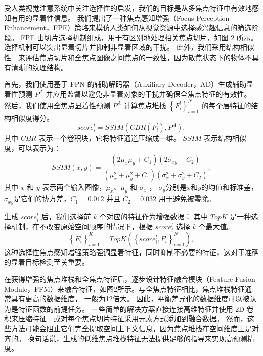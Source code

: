 

受人类视觉注意系统中关注选择性的启发，我们的目标是从多焦点特征中有效地感知有用的显着性信息。 我们提出了一种焦点感知增强（Focus Perception Enhancement，FPE）策略来模仿人类如何从视觉资源中选择感兴趣信息的筛选阶段。 FPE 由切片选择机制组成，用于有区别地处理相关焦点切片，如图 2 所示。选择机制可以突出显着切片并抑制非显着区域的干扰。 此外，我们采用结构相似性~\cite{wang2003multiscale}~来评估焦点切片和全焦点图像之间焦点的一致性，因为散焦状态下的物体不具有清晰的纹理结构。 
%
%
%
%
\par
%
%
首先，我们使用基于 FPN 的辅助解码器（Auxiliary Decoder，AD）生成辅助显着性预测 $ P^{A} $ 并应用监督以避免非显着对象的干扰并确保全焦点特征的有效性。 然后，我们使用全焦点显着性预测 $ P^{A} $ 计算焦点堆栈 $ \left \{ F_{i}^{l} \right \}_{i=1}^{N} $ 的每个层特征的结构相似度得分。 
\begin{equation}
	score_{i}^{l} = SSIM \left ( CBR \left ( F_{i}^{l} \right ), P^{A} \right ),
\end{equation}
%
%
其中 $CBR$ 表示一个卷积块，它将特征通道压缩成一维。 $SSIM$ 表示结构相似度，可以表示为： 
%
%
\begin{equation} 	
	SSIM(x,y)=\frac{\left ( 2\mu_{x}\mu_{y}+C_{1} \right ) \left (  2\sigma_{xy}+C_{2} \right )  } 	
	{\left ( \mu_{x}^{2} + \mu_{y}^{2}+C_{1}\right ) \left ( \sigma_{x}^{2}+ \sigma_{y}^{2} + C_{2} \right ) } , 	
\end{equation}
其中 $x$ 和 $y$ 表示两个输入图像，$\mu_{x}$、$\mu_{y}$ 和 $\sigma_{x}$ ， $\sigma_{y}$分别是$x$和$y$的均值和标准差，$\sigma_{xy}$是它们的协方差，$C_{1} = 0.012$ 并且 $C_{2} = 0.032$ 用于避免被零除。 
%
%
%
%
\par
%
%
生成 $ score_{i}^{l} $ 后，我们选择前 $k$ 个对应的特征作为增强数据：
其中 $ TopK $ 是一种选择机制，在不改变原始空间顺序的情况下，根据 $ score_{i}^{l} $ 选择 $k$ 个最大值。 
\begin{equation}
	\left \{ E_{i}^{l} \right \}_{i=1}^{K} = TopK \left ( \left \{ score_{i}^{l}, F_{i}^{l} \right \}_{i=1}^{N} \right ), 	
\end{equation}
%
%
这种选择性焦点感知增强策略强调显着特征，同时抑制不必要的特征，这对于准确的显着目标检测至关重要。
%
%
%
%
\par
%
%
在获得增强的焦点堆栈和全焦点特征后，逐步设计特征融合模块（Feature Fusion Module，FFM）来融合特征，如图2所示。与全焦点特征相比，焦点堆栈特征通常具有更高的数据维度， 一般为12倍大。 因此，平衡差异化的数据维度可以被认为是特征函数的前提任务。
一些简单的解决方案直接连接高维特征并使用 2D 卷积来压缩特征~\cite{piao2021panet}~或对每个焦点切片特征采用元素方式添加到融合数据\cite{liu2021light}。 然而，这些方法可能会阻止它们完全提取空间上下文信息，因为焦点堆栈在空间维度上是对齐的。 换句话说，生成的低维焦点堆栈特征无法提供足够的指导来实现高预测精度。 
